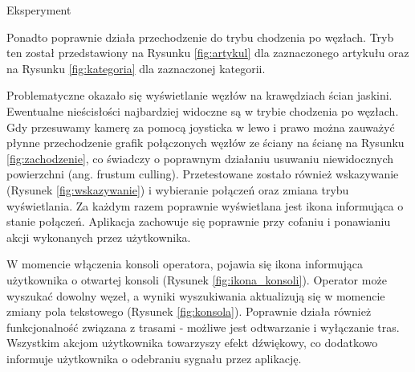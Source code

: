 \begin{chapter}{Eksperyment}


Ponadto poprawnie działa przechodzenie do trybu chodzenia po węzłach. Tryb ten został przedstawiony na Rysunku \ref{fig:artykul} dla zaznaczonego artykułu oraz na Rysunku \ref{fig:kategoria} dla zaznaczonej kategorii. 



Problematyczne okazało się wyświetlanie węzłów na krawędziach ścian jaskini. Ewentualne nieścisłości najbardziej widoczne są w trybie chodzenia po węzłach. Gdy przesuwamy kamerę za pomocą joysticka w lewo i prawo można zauważyć płynne przechodzenie grafik połączonych węzłów ze ściany na ścianę na Rysunku \ref{fig:zachodzenie}, co świadczy o poprawnym działaniu usuwaniu niewidocznych powierzchni (ang. frustum culling). 
Przetestowane zostało również wskazywanie (Rysunek \ref{fig:wskazywanie}) i wybieranie połączeń oraz zmiana trybu wyświetlania. Za każdym razem poprawnie wyświetlana jest ikona informująca o stanie połączeń. Aplikacja zachowuje się poprawnie przy cofaniu i ponawianiu akcji wykonanych przez użytkownika. 



W momencie włączenia konsoli operatora, pojawia się ikona informująca użytkownika o otwartej konsoli (Rysunek \ref{fig:ikona_konsoli}). Operator może wyszukać dowolny węzeł, a wyniki wyszukiwania aktualizują się w momencie zmiany pola tekstowego (Rysunek \ref{fig:konsola}). Poprawnie działa również funkcjonalność związana z trasami - możliwe jest odtwarzanie i wyłączanie tras. Wszystkim akcjom użytkownika towarzyszy efekt dźwiękowy, co dodatkowo informuje użytkownika o odebraniu sygnału przez aplikację.



\end{chapter}
